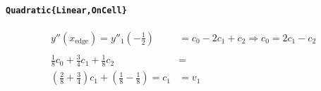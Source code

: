 \documentclass{article}
\begin{document}
\paragraph{\texttt{Quadratic\{Linear,OnCell\}}}
\begin{align*}
y''(x_{\text{edge}}) = y''_1\left(-\tfrac{1}{2}\right) &= c_0 - 2 c_1 + c_2 \Rightarrow c_0 = 2 c_1 - c_2 \\
\\
\frac{1}{8}c_0 + \frac{3}{4} c_1 + \frac{1}{8} c_2 &= \\
\left(\frac{2}{8}+\frac{3}{4}\right)c_1 + \left(\frac{1}{8}-\frac{1}{8}\right) = c_1 &= v_1
\end{align*}

\nocite{*}
\printbibliography
\end{document}
